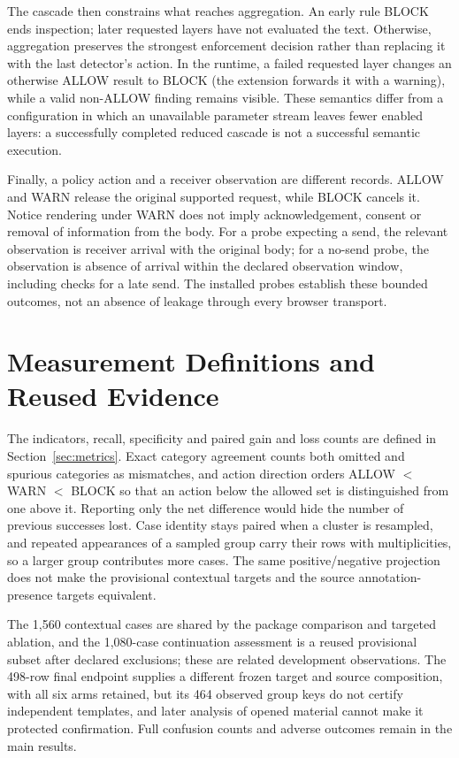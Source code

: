 \documentclass[sigconf]{acmart}
\theoremstyle{acmdefinition}\newtheorem{property}{Property}
\begin{document}
The cascade then constrains what reaches aggregation. An early rule BLOCK ends inspection; later requested layers have not evaluated the text. Otherwise, aggregation preserves the strongest enforcement decision rather than replacing it with the last detector's action. In the runtime, a failed requested layer changes an otherwise ALLOW result to BLOCK (the extension forwards it with a warning), while a valid non-ALLOW finding remains visible. These semantics differ from a configuration in which an unavailable parameter stream leaves fewer enabled layers: a successfully completed reduced cascade is not a successful semantic execution.

Finally, a policy action and a receiver observation are different records. ALLOW and WARN release the original supported request, while BLOCK cancels it. Notice rendering under WARN does not imply acknowledgement, consent or removal of information from the body. For a probe expecting a send, the relevant observation is receiver arrival with the original body; for a no-send probe, the observation is absence of arrival within the declared observation window, including checks for a late send. The installed probes establish these bounded outcomes, not an absence of leakage through every browser transport.

\section{Measurement Definitions and Reused Evidence}
\label{app:measurement}
The indicators, recall, specificity and paired gain and loss counts are defined in Section~\ref{sec:metrics}. Exact category agreement counts both omitted and spurious categories as mismatches, and action direction orders ALLOW $<$ WARN $<$ BLOCK so that an action below the allowed set is distinguished from one above it. Reporting only the net difference would hide the number of previous successes lost. Case identity stays paired when a cluster is resampled, and repeated appearances of a sampled group carry their rows with multiplicities, so a larger group contributes more cases. The same positive/negative projection does not make the provisional contextual targets and the source annotation-presence targets equivalent.

The 1,560 contextual cases are shared by the package comparison and targeted ablation, and the 1,080-case continuation assessment is a reused provisional subset after declared exclusions; these are related development observations. The 498-row final endpoint supplies a different frozen target and source composition, with all six arms retained, but its 464 observed group keys do not certify independent templates, and later analysis of opened material cannot make it protected confirmation. Full confusion counts and adverse outcomes remain in the main results.
\end{document}
